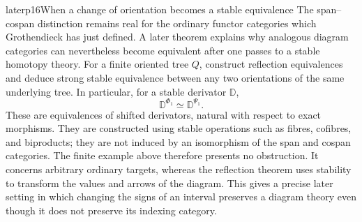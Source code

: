 \begin{dcomment}{later}{p16}{When a change of orientation becomes a stable equivalence}
The span--cospan distinction remains real for the ordinary functor categories which Grothendieck has just defined. A later theorem explains why analogous diagram categories can nevertheless become equivalent after one passes to a stable homotopy theory. For a finite oriented tree $Q$, \citet[Theorem~9.19 and Corollary~9.23, arXiv v3]{GrothStovicek2016Trees} construct reflection equivalences and deduce strong stable equivalence between any two orientations of the same underlying tree. In particular, for a stable derivator $\mathbb D$,
\[
 \mathbb D^{\Phi_1}\simeq\mathbb D^{\Psi_1}.
\]
These are equivalences of shifted derivators, natural with respect to exact morphisms. They are constructed using stable operations such as fibres, cofibres, and biproducts; they are not induced by an isomorphism of the span and cospan categories. The finite example above therefore presents no obstruction. It concerns arbitrary ordinary targets, whereas the reflection theorem uses stability to transform the values and arrows of the diagram. This gives a precise later setting in which changing the signs of an interval preserves a diagram theory even though it does not preserve its indexing category.
\end{dcomment}

